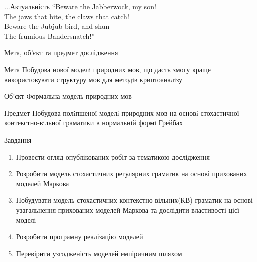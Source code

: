 \documentclass{beamer}
\begin{document}
\begin{darkframes}
\begin{frame}{...Актуальність}
      “Beware the Jabberwock, my son!\\
      The jaws that bite, the claws that catch!\\
      Beware the Jubjub bird, and shun\\
      The frumious Bandersnatch!”\\
    \end{frame}

    \begin{frame}[label=lists]{Мета, об'єкт та предмет дослідження}
      \begin{exampleblock}{Мета}
      Побудова нової моделi природних мов, що дасть змогу краще використовувати структуру мов для методiв криптоаналiзу
      \end{exampleblock}
      \begin{block}{Об'єкт}
        Формальна модель природних мов
      \end{block}
      \begin{block}{Предмет}
        Побудова полiпшеної моделi природних мов на основi стохастичної контекстно-вiльної граматики в нормальнiй формi Грейбах
      \end{block}

    \end{frame}

    \begin{frame}{Завдання}
      \begin{enumerate}
      \item Провести огляд опублікованих робіт за тематикою дослідження
      \item Розробити модель стохастичних регулярних граматик на основі прихованих моделей Маркова
      \item Побудувати модель стохастичних контекстно-вільних(КВ) граматик на основі узагальнення прихованих моделей Маркова та дослідити властивості цієї моделі
      \item Розробити програмну реалізацію моделей
      \item Перевірити узгодженість моделей емпіричним шляхом
      \end{enumerate}
    \end{frame}


\end{darkframes}
\end{document}
